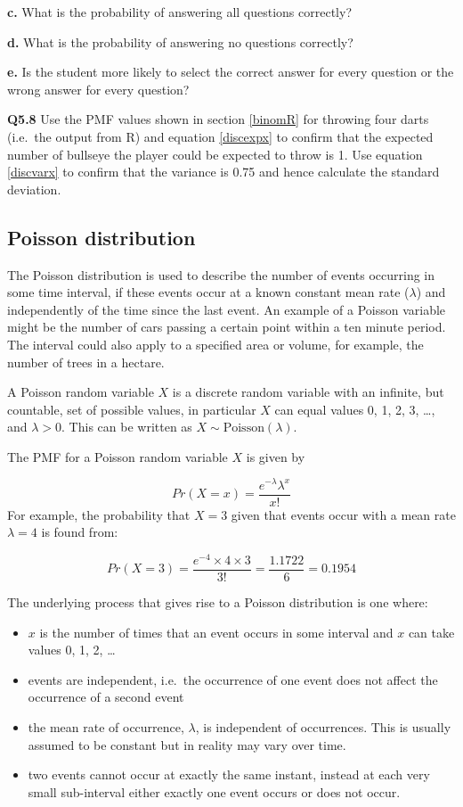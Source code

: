 \documentclass[
  oneside]{krantz}
\providecommand{\tightlist}{%
  \setlength{\itemsep}{0pt}\setlength{\parskip}{0pt}}
\begin{document}
\textbf{c.} What is the probability of answering all questions correctly?

\textbf{d.} What is the probability of answering no questions correctly?

\textbf{e.} Is the student more likely to select the correct answer for every question or the wrong answer for every question?

\textbf{Q5.8} Use the PMF values shown in section \ref{binomR} for throwing four darts (i.e.~the output from R) and equation \ref{discexpx} to confirm that the expected number of bullseye the player could be expected to throw is 1. Use equation \ref{discvarx} to confirm that the variance is 0.75 and hence calculate the standard deviation.

\hypertarget{poisdist}{%
\subsection{Poisson distribution}\label{poisdist}}

The Poisson distribution is used to describe the number of events occurring in some time interval, if these events occur at a known constant mean rate (\(\lambda\)) and independently of the time since the last event. An example of a Poisson variable might be the number of cars passing a certain point within a ten minute period. The interval could also apply to a specified area or volume, for example, the number of trees in a hectare.

A Poisson random variable \(X\) is a discrete random variable with an infinite, but countable, set of possible values, in particular \(X\) can equal values 0, 1, 2, 3, \ldots, and \(\lambda > 0\). This can be written as \(X \sim \textrm{Poisson}(\lambda)\).

The PMF for a Poisson random variable \(X\) is given by

\[ Pr(X=x) = \frac{e^{-\lambda}\lambda^x}{x!}\]
For example, the probability that \(X=3\) given that events occur with a mean rate \(\lambda=4\) is found from:

\[ Pr(X=3) = \frac{e^{-4} \times 4 \times 3}{3!} = \frac{1.1722}{6} = 0.1954\]

The underlying process that gives rise to a Poisson distribution is one where:

\begin{itemize}
\tightlist
\item
  \(x\) is the number of times that an event occurs in some interval and \(x\) can take values 0, 1, 2, \ldots{}
\item
  events are independent, i.e.~the occurrence of one event does not affect the occurrence of a second event
\item
  the mean rate of occurrence, \(\lambda\), is independent of occurrences. This is usually assumed to be constant but in reality may vary over time.
\item
  two events cannot occur at exactly the same instant, instead at each very small sub-interval either exactly one event occurs or does not occur.
\end{itemize}
\end{document}
